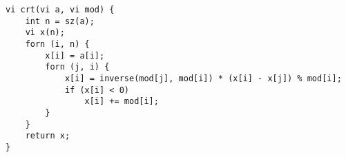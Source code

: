 \begin{verbatim}
vi crt(vi a, vi mod) {
	int n = sz(a);
	vi x(n);
	forn (i, n) {
		x[i] = a[i];
		forn (j, i) {
		 	x[i] = inverse(mod[j], mod[i]) * (x[i] - x[j]) % mod[i];
		 	if (x[i] < 0)
		 		x[i] += mod[i];
		}
	}
	return x;
}
\end{verbatim}
